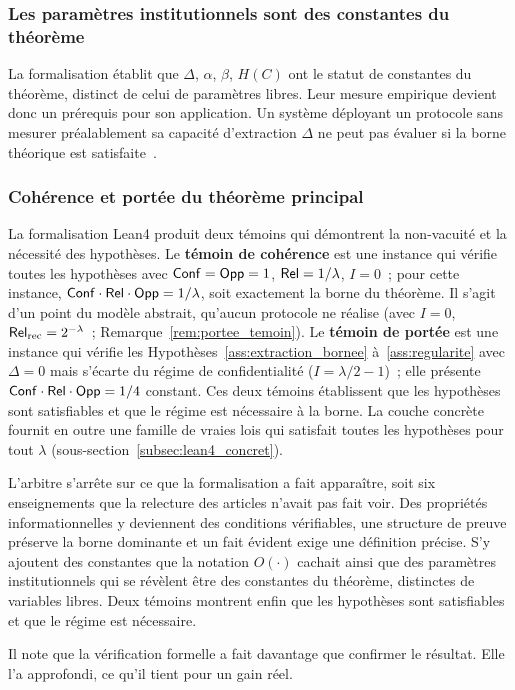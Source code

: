 \begin{sloppypar}
\subsubsection{Les param\`etres institutionnels sont des constantes du th\'eor\`eme}
\label{subsubsec:parametres_constantes}

La formalisation \'etablit que $\Delta$, $\alpha$, $\beta$, $H(C)$ ont le
statut de constantes
du th\'eor\`eme, distinct de celui de param\`etres libres. Leur mesure empirique devient donc un
pr\'erequis pour son application. Un syst\`eme d\'eployant un protocole
sans mesurer pr\'ealablement sa capacit\'e d'extraction $\Delta$ ne peut
pas \'evaluer si la borne th\'eorique est satisfaite~\cite{Grossklags10,Herley09}.

\subsubsection{Coh\'erence et port\'ee du th\'eor\`eme principal}
\label{subsubsec:consequences_empiriques_borne}

La formalisation Lean4 produit deux t\'emoins qui d\'emontrent la
non-vacuit\'e et la n\'ecessit\'e des hypoth\`eses. Le \textbf{t\'emoin
de coh\'erence} est une instance qui v\'erifie toutes les hypoth\`eses
avec $\mathsf{Conf} = \mathsf{Opp} = 1$, $\mathsf{Rel} = 1/\lambda$, $I = 0$~; pour cette
instance, $\mathsf{Conf} \cdot \mathsf{Rel} \cdot \mathsf{Opp} = 1/\lambda$, soit
exactement la borne du th\'eor\`eme. Il s'agit d'un point du mod\`ele abstrait,
qu'aucun protocole ne r\'ealise (avec $I = 0$, $\mathsf{Rel}_{\mathrm{rec}} = 2^{-\lambda}$~;
Remarque~\ref{rem:portee_temoin}). Le \textbf{t\'emoin de port\'ee}
est une instance qui v\'erifie les Hypoth\`eses~\ref{ass:extraction_bornee} \`a~\ref{ass:regularite} avec
$\Delta = 0$ mais s'\'ecarte du r\'egime de confidentialit\'e
($I = \lambda/2 - 1$)~; elle pr\'esente $\mathsf{Conf} \cdot \mathsf{Rel} \cdot \mathsf{Opp} = 1/4$
constant. Ces deux t\'emoins \'etablissent que les hypoth\`eses sont
satisfiables et que le r\'egime est n\'ecessaire \`a la borne. La couche concr\`ete fournit
en outre une famille de vraies lois qui satisfait toutes les hypoth\`eses pour tout
$\lambda$ (sous-section~\ref{subsec:lean4_concret}).
\end{sloppypar}

\begin{boiteArbitre}
L'arbitre s'arr\^ete sur ce que la formalisation a fait appara\^itre, soit six
enseignements que la relecture des articles n'avait pas fait voir. Des propri\'et\'es
informationnelles y deviennent des conditions v\'erifiables, une
structure de preuve pr\'eserve la borne dominante et un
fait \og \'evident \fg{} exige une d\'efinition pr\'ecise. S'y ajoutent des constantes que
la notation $O(\cdot)$ cachait ainsi que des param\`etres institutionnels qui
se r\'ev\`elent \^etre des constantes du th\'eor\`eme, distinctes de variables
libres. Deux t\'emoins montrent enfin que les hypoth\`eses sont satisfiables et que le
r\'egime est n\'ecessaire.

Il note que la v\'erification formelle a fait davantage que confirmer le
r\'esultat. Elle l'a approfondi, ce qu'il tient pour un gain r\'eel.
\end{boiteArbitre}

